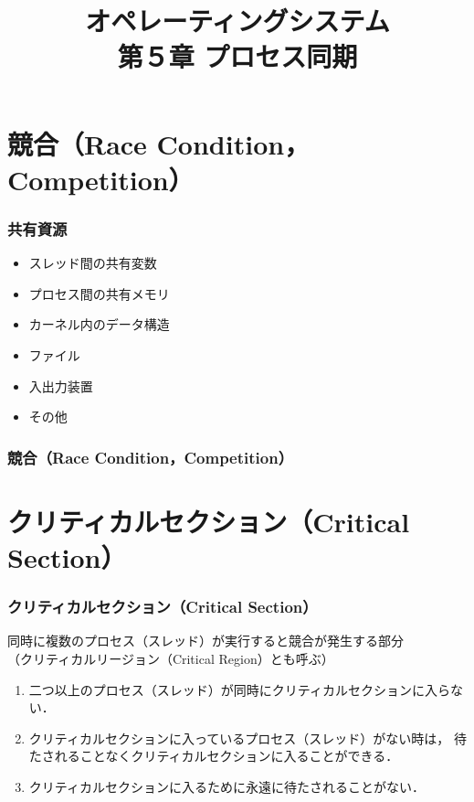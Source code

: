 \documentclass[dvipdfmx]{beamer}
\begin{document}
\title[OS]{オペレーティングシステム\\第５章 プロセス同期}
\date{}

\begin{frame}
  \titlepage
\end{frame}


\section{競合（Race Condition，Competition）}
\begin{frame}
  \frametitle{共有資源}
  \begin{itemize}
    \item スレッド間の共有変数
    \item プロセス間の共有メモリ
    \item カーネル内のデータ構造
    \item ファイル
    \item 入出力装置
    \item その他
  \end{itemize}
\end{frame}

\begin{frame}
  \frametitle{競合（Race Condition，Competition）}
  
\end{frame}

\section{クリティカルセクション（Critical Section）}
\begin{frame}
  \frametitle{クリティカルセクション（Critical Section）}
  同時に複数のプロセス（スレッド）が実行すると競合が発生する部分\\
  （クリティカルリージョン（Critical Region）とも呼ぶ）
  \begin{enumerate}
  \item 二つ以上のプロセス（スレッド）が同時にクリティカルセクションに入らない．
  \item クリティカルセクションに入っているプロセス（スレッド）がない時は，
    待たされることなくクリティカルセクションに入ることができる．
  \item クリティカルセクションに入るために永遠に待たされることがない．
  \end{enumerate}
\end{frame}
\end{document}
